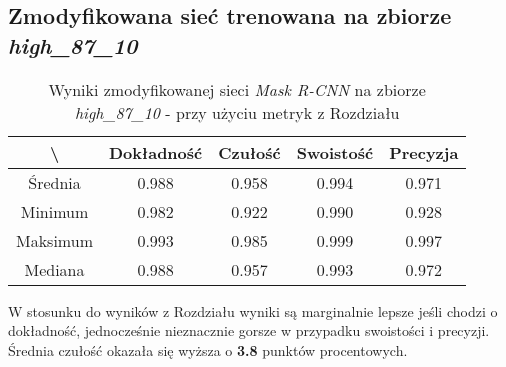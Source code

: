 \subsection{Zmodyfikowana sieć trenowana na zbiorze \textit{high\_87\_10}}
\label{sec:results_high_modified}

\begin{table}[H]
	\centering
	\caption{Wyniki zmodyfikowanej sieci \textit{Mask R-CNN} na zbiorze \textit{high\_87\_10} - przy użyciu metryk z Rozdziału }
	\vspace{6pt}
	{\footnotesize
		\begin{tabular}{|c|c|c|c|c|}
      \hline \textbackslash & Dokładność & Czułość & Swoistość & Precyzja \\
      \hline Średnia & 0.988 & 0.958 & 0.994 & 0.971 \\
      \hline Minimum & 0.982 & 0.922 & 0.990 & 0.928 \\
      \hline Maksimum & 0.993 & 0.985 & 0.999 & 0.997 \\
      \hline Mediana & 0.988 & 0.957 & 0.993 & 0.972 \\
      \hline
		\end{tabular}
	}
  \vspace{0pt}
  \label{Tab:high_modified_calculated}
\end{table}

W stosunku do wyników z Rozdziału  wyniki są marginalnie lepsze jeśli chodzi o dokładność, jednocześnie nieznacznie gorsze w przypadku swoistości i precyzji. Średnia czułość okazała się wyższa o \textbf{3.8} punktów procentowych.
